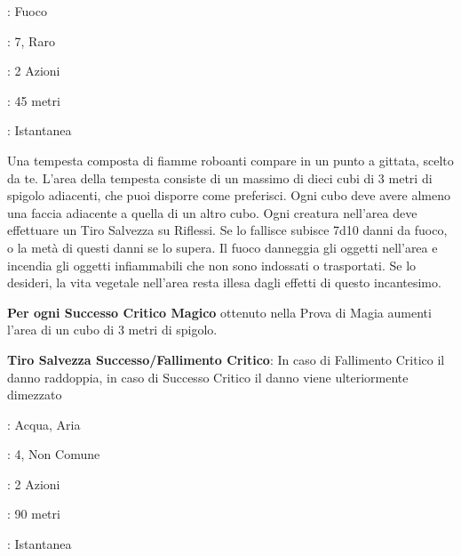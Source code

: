 \begin{multicols}{2}

\noindent\colorbox{OBSSgold!10}{
\begin{minipage}{0.95\linewidth}
\begin{description}[noitemsep, topsep=0pt, parsep=0pt, partopsep=0pt, leftmargin=0cm, labelwidth=1.3cm]
	\item[\textbf{Lista}]: Fuoco
	\item[\textbf{Livello}]: 7, Raro
	\item[\textbf{Lancio}]: 2 Azioni
	\item[\textbf{Gittata}]: 45 metri
	\item[\textbf{Durata}]: Istantanea
\end{description}
\end{minipage}}\smallskip

Una tempesta composta di fiamme roboanti compare in un punto a gittata, scelto da te. L'area della tempesta consiste di un massimo di dieci cubi di 3 metri di spigolo adiacenti, che puoi disporre come preferisci. Ogni cubo deve avere almeno una faccia adiacente a quella di un altro cubo. Ogni creatura nell'area deve effettuare un Tiro Salvezza su Riflessi. Se lo fallisce subisce 7d10 danni da fuoco, o la metà di questi danni se lo supera. Il fuoco danneggia gli oggetti nell'area e incendia gli oggetti infiammabili che non sono indossati o trasportati. Se lo desideri, la vita vegetale nell'area resta illesa dagli effetti di questo incantesimo.

\textbf{Per ogni Successo Critico Magico} ottenuto nella Prova di Magia aumenti l'area di un cubo di 3 metri di spigolo.

\textbf{Tiro Salvezza Successo/Fallimento Critico}: In caso di Fallimento Critico il danno raddoppia, in caso di Successo Critico il danno viene ulteriormente dimezzato

\noindent\colorbox{OBSSgold!10}{
\begin{minipage}{0.95\linewidth}
\begin{description}[noitemsep, topsep=0pt, parsep=0pt, partopsep=0pt, leftmargin=0cm, labelwidth=1.3cm]
	\item[\textbf{Lista}]: Acqua, Aria
	\item[\textbf{Livello}]: 4, Non Comune
	\item[\textbf{Lancio}]: 2 Azioni
	\item[\textbf{Gittata}]: 90 metri
	\item[\textbf{Durata}]: Istantanea
\end{description}
\end{minipage}}\smallskip


\end{multicols}
